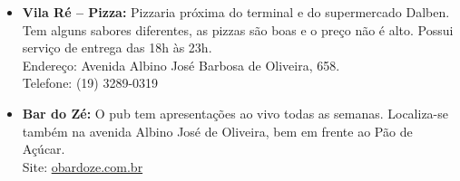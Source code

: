\begin{itemize}
\item   \textbf{Vila Ré -- Pizza:} Pizzaria próxima do terminal e do
        supermercado Dalben. Tem alguns sabores diferentes, as pizzas são boas e
        o preço não é alto. Possui serviço de entrega das 18h às 23h.
        \\Endereço: Avenida Albino José Barbosa de Oliveira, 658.
        \\Telefone: (19) 3289-0319

\item   \textbf{Bar do Zé:} O pub tem apresentações ao vivo todas as semanas.
        Localiza-se também na avenida Albino José de Oliveira, bem em frente ao
        Pão de Açúcar.
        \\Site: \url{obardoze.com.br}
\end{itemize}
